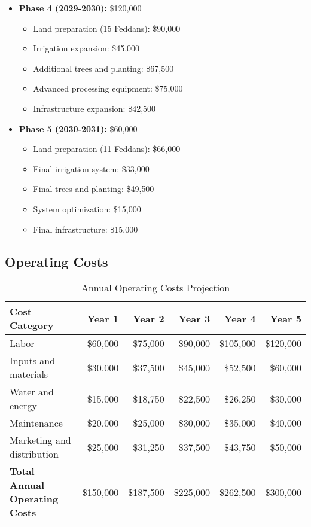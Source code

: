 \begin{itemize}
    \item \textbf{Phase 4 (2029-2030):} \$120,000
    \begin{itemize}
        \item Land preparation (15 Feddans): \$90,000
        \item Irrigation expansion: \$45,000
        \item Additional trees and planting: \$67,500
        \item Advanced processing equipment: \$75,000
        \item Infrastructure expansion: \$42,500
    \end{itemize}
    
    \item \textbf{Phase 5 (2030-2031):} \$60,000
    \begin{itemize}
        \item Land preparation (11 Feddans): \$66,000
        \item Final irrigation system: \$33,000
        \item Final trees and planting: \$49,500
        \item System optimization: \$15,000
        \item Final infrastructure: \$15,000
    \end{itemize}
\end{itemize}

\subsection{Operating Costs}

\begin{table}[h]
\centering
\begin{tabular}{|l|r|r|r|r|r|}
\hline
\textbf{Cost Category} & \textbf{Year 1} & \textbf{Year 2} & \textbf{Year 3} & \textbf{Year 4} & \textbf{Year 5} \\
\hline
Labor & \$60,000 & \$75,000 & \$90,000 & \$105,000 & \$120,000 \\
Inputs and materials & \$30,000 & \$37,500 & \$45,000 & \$52,500 & \$60,000 \\
Water and energy & \$15,000 & \$18,750 & \$22,500 & \$26,250 & \$30,000 \\
Maintenance & \$20,000 & \$25,000 & \$30,000 & \$35,000 & \$40,000 \\
Marketing and distribution & \$25,000 & \$31,250 & \$37,500 & \$43,750 & \$50,000 \\
\hline
\textbf{Total Annual Operating Costs} & \$150,000 & \$187,500 & \$225,000 & \$262,500 & \$300,000 \\
\hline
\end{tabular}
\caption{Annual Operating Costs Projection}
\end{table}

